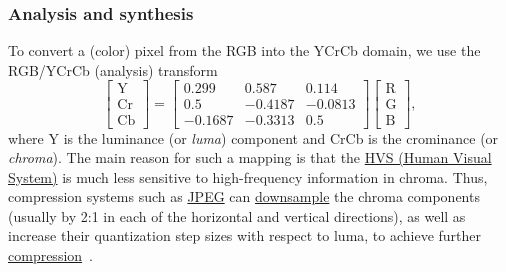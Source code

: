\subsubsection{Analysis and synthesis}
To convert a (color) pixel from the RGB into the YCrCb domain, we use
the RGB/YCrCb (analysis) transform~\cite{malvar2008lifting}
\begin{equation}
  \begin{bmatrix}
    \text{Y} \\
    \text{Cr} \\
    \text{Cb}
  \end{bmatrix}
  =
  \begin{bmatrix}
    0.299   &   0.587 & 0.114 \\ 
    0.5     & -0.4187 & -0.0813 \\
    -0.1687 & -0.3313 & 0.5
  \end{bmatrix}
  \begin{bmatrix}
    \text{R} \\
    \text{G} \\
    \text{B}
  \end{bmatrix},
  \label{eq:YCrCb}
\end{equation}
where Y is the luminance (or \emph{luma}) component and CrCb is the
crominance (or \emph{chroma}). The main reason for such a mapping is
that the \href{https://en.wikipedia.org/wiki/Visual_system}{HVS (Human
  Visual System)} is much less sensitive to high-frequency information
in chroma. Thus, compression systems such as
\href{https://en.wikipedia.org/wiki/JPEG}{JPEG} can
\href{https://en.wikipedia.org/wiki/Downsampling_(signal_processing)}{downsample}
the chroma components (usually by 2:1 in each of the horizontal and
vertical directions), as well as increase their quantization step
sizes with respect to luma, to achieve further
\href{https://en.wikipedia.org/wiki/Data_compression_ratio}{compression}~\cite{malvar2008lifting}.

